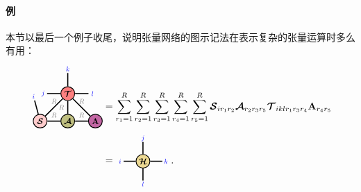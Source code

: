 \paragraph{例} 本节以最后一个例子收尾，说明张量网络的图示记法在表示复杂的张量运算时多么有用：
\begin{align}\label{eq:einsum}
\begin{tikzpicture}[baseline = \baseline]
    \tikzset{tensor/.style = {minimum size = 0.5cm,shape = circle,thick,draw=black,inner sep = 0pt}, edge/.style = 
    {thick,line width=.4mm},every loop/.style={}}
    \def\y{-0.5}
    \def\x{0}
    \node[tensor,fill=green!50!red!50!white] (At) at (\x,\y){\scalebox{0.85}{$\At$}};
    \node[tensor,fill=red!20!white] (S) at (\x-1,\y){\scalebox{0.85}{$\St$}};
    \node[tensor,fill=red!50!white] (Tt) at (\x,\y+1){\scalebox{0.85}{$\Tt$}};
    \node[tensor,fill=blue!40!red!60!white] (A) at (\x+1,\y){\scalebox{0.85}{$\Ab$}};
    \draw[edge] (Tt) -- (At) node [midway,left] {\scalebox{0.7}{\dimcolor{$R$}}};
    \draw[edge] (Tt) -- (A) node [above,midway] {\scalebox{0.7}{\dimcolor{$R$}}};
    \draw[edge] (At) -- (A)  node [midway,above] {\scalebox{0.7}{\dimcolor{$R$}}};
    \draw[edge] (Tt) -- (\x,\y+1.75) node [pos=1.3] {\scalebox{0.7}{\indcolor{$k$}}};
    \draw[edge] (At) -- (S)  node [midway,above] {\scalebox{0.7}{\dimcolor{$R$}}};
    \draw[edge] (S) -- (Tt)  node [midway,above] {\scalebox{0.7}{\dimcolor{$R$}}};
    \draw[edge] (Tt) -- (\x-0.75,\y+1)  node [pos=1.3] {\scalebox{0.7}{\indcolor{$j$}}};
    \draw[edge] (Tt) -- (\x+0.75,\y+1)  node [pos=1.3] {\scalebox{0.7}{\indcolor{$l$}}};
    \draw[edge] (S) -- (\x-1.2,\y+0.75)  node [pos=1.3] {\scalebox{0.7}{\indcolor{$i$}}};
    \end{tikzpicture}
&=
\sum_{r_1=1}^R\sum_{r_2=1}^R\sum_{r_3=1}^R\sum_{r_4=1}^R\sum_{r_5=1}^R\St_{ir_1 r_2}\At_{r_2r_3r_5}\Tt_{iklr_1r_3r_4}\Ab_{r_4r_5}\nonumber\\
&=
    \begin{tikzpicture}[baseline = \baseline]
    \tikzset{tensor/.style = {minimum size = 0.5cm,shape = circle,thick,draw=black,inner sep = 0pt}, edge/.style = 
    {thick,line width=.4mm},every loop/.style={}}
    \def\y{0}
    \def\x{0}
    \node[tensor,fill=blue!50!red!30!yellow!50!white] (Ht) at (\x,\y){\scalebox{0.85}{$\Ht$}};
    \draw[edge](Ht) -- (\x,\y+0.7) node [pos=1.3] {\scalebox{0.7}{\indcolor{$j$}}};
    \draw[edge](Ht) -- (\x,\y-0.7) node [pos=1.3] {\scalebox{0.7}{\indcolor{$l$}}};
    \draw[edge](Ht) -- (\x-0.7,\y) node [pos=1.3] {\scalebox{0.7}{\indcolor{$i$}}};
    \draw[edge](Ht) -- (\x+0.7,\y) node[pos=1.3] {\scalebox{0.7}{\indcolor{$k$}}};
    \end{tikzpicture}.
\end{align}
